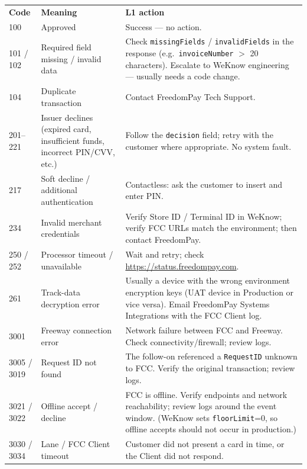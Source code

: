 \documentclass[a4paper,10pt]{article}
\begin{document}
\begin{center}
\renewcommand{\arraystretch}{1.35}\small
\begin{tabularx}{\textwidth}{L{12mm} L{44mm} X}
\color{white}\textbf{Code} &
\color{white}\textbf{Meaning} & \color{white}\textbf{L1 action}\\
100 & Approved & Success --- no action.\\
101 / 102 & Required field missing / invalid data &
Check \texttt{missingFields} / \texttt{invalidFields} in the response
(e.g.\ \texttt{invoiceNumber} $>$ 20 characters). Escalate to WeKnow
engineering --- usually needs a code change.\\
104 & Duplicate transaction & Contact FreedomPay Tech Support.\\
201--221 & Issuer declines (expired card, insufficient funds, incorrect
PIN/CVV, etc.) & Follow the \texttt{decision} field; retry with the
customer where appropriate. No system fault.\\
217 & Soft decline / additional authentication &
Contactless: ask the customer to insert and enter PIN.\\
234 & Invalid merchant credentials &
Verify Store ID / Terminal ID in WeKnow; verify FCC URLs match the
environment; then contact FreedomPay.\\
250 / 252 & Processor timeout / unavailable &
Wait and retry; check \url{https://status.freedompay.com}.\\
261 & Track-data decryption error &
Usually a device with the wrong environment encryption keys (UAT device
in Production or vice versa). Email FreedomPay Systems Integrations with
the FCC Client log.\\
3001 & Freeway connection error &
Network failure between FCC and Freeway. Check connectivity/firewall;
review logs.\\
3005 / 3019 & Request ID not found &
The follow-on referenced a \texttt{RequestID} unknown to FCC. Verify the
original transaction; review logs.\\
3021 / 3022 & Offline accept / decline &
FCC is offline. Verify endpoints and network reachability; review logs
around the event window. (WeKnow sets \texttt{floorLimit}=0, so offline
accepts should not occur in production.)\\
3030 / 3034 & Lane / FCC Client timeout &
Customer did not present a card in time, or the Client did not respond.

\end{tabularx}
\end{center}
\end{document}
